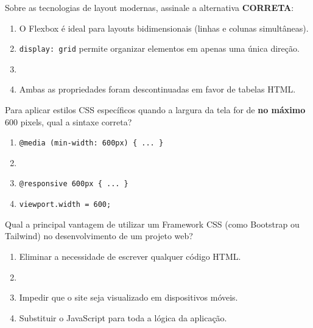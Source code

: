 \documentclass[12pt,a4paper]{article}
\newcommand{\correto}[1]{\iftoggle{gabarito}{\textbf{\color{corGabarito}#1}}{#1}}
\begin{document}
\begin{tcolorbox}[colback=white, colframe=azulTitulo, title=Questão 6: Layouts Modernos (Flexbox e Grid)]
    Sobre as tecnologias de layout modernas, assinale a alternativa \textbf{CORRETA}:
    \begin{enumerate}[label=\alph*)]
        \item O Flexbox é ideal para layouts bidimensionais (linhas e colunas simultâneas).
        \item \texttt{display: grid} permite organizar elementos em apenas uma única direção.
        \item \correto{O CSS Grid é otimizado para layouts bidimensionais, enquanto o Flexbox foca em alinhamento unidimensional.}
        \item Ambas as propriedades foram descontinuadas em favor de tabelas HTML.
    \end{enumerate}
\end{tcolorbox}

\begin{tcolorbox}[colback=white, colframe=azulTitulo, title=Questão 7: Responsividade]
    Para aplicar estilos CSS específicos quando a largura da tela for de \textbf{no máximo} 600 pixels, qual a sintaxe correta?
    \begin{enumerate}[label=\alph*)]
        \item \texttt{@media (min-width: 600px) \{ ... \}}
        \item \correto{@media (max-width: 600px) \{ ... \}}
        \item \texttt{@responsive 600px \{ ... \}}
        \item \texttt{viewport.width = 600;}
    \end{enumerate}
\end{tcolorbox}

\begin{tcolorbox}[colback=white, colframe=azulTitulo, title=Questão 8: Frameworks CSS]
    Qual a principal vantagem de utilizar um Framework CSS (como Bootstrap ou Tailwind) no desenvolvimento de um projeto web?
    \begin{enumerate}[label=\alph*)]
        \item Eliminar a necessidade de escrever qualquer código HTML.
        \item \correto{Ganho de produtividade através de componentes e utilitários pré-estilizados e testados.}
        \item Impedir que o site seja visualizado em dispositivos móveis.
        \item Substituir o JavaScript para toda a lógica da aplicação.
    \end{enumerate}
\end{tcolorbox}
\end{document}

